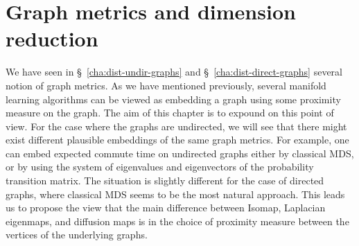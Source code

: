 \chapter{Graph metrics and dimension reduction}
\label{cha:graph-metr-dimens}
We have seen in \S~\ref{cha:dist-undir-graphs} and
\S~\ref{cha:dist-direct-graphs} several notion of graph metrics. As we
have mentioned previously, several manifold learning algorithms can be
viewed as embedding a graph using some proximity measure on the
graph. The aim of this chapter is to expound on this point of
view. For the case where the graphs are undirected, we will see that
there might exist different plausible embeddings of the same graph
metrics. For example, one can embed expected commute time on
undirected graphs either by classical MDS, or by using the system of
eigenvalues and eigenvectors of the probability transition matrix.
The situation is slightly different for the case of directed graphs,
where classical MDS seems to be the most natural approach. This leads
us to propose the view that the main difference between Isomap,
Laplacian eigenmaps, and diffusion maps is in the choice of
proximity measure between the vertices of the underlying graphs.
